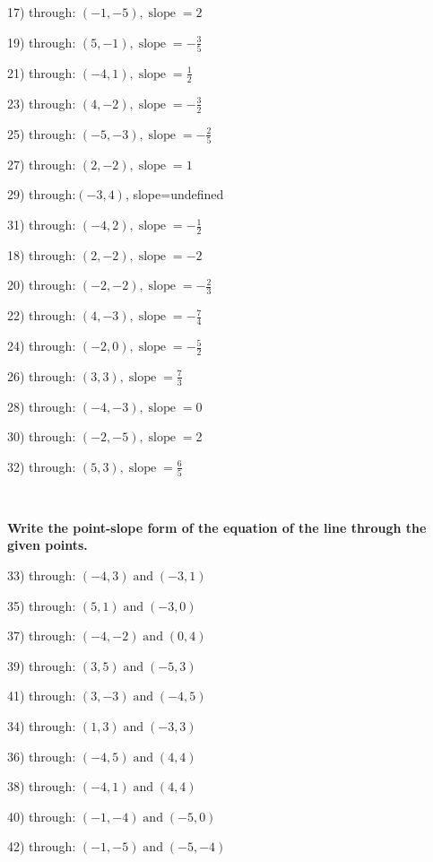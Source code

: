 \documentclass[11pt]{book}
\newcommand{\tmop}[1]{\ensuremath{\operatorname{#1}}}
\newcommand{\tmstrong}[1]{\textbf{#1}}
\theoremstyle{definition}  %
\begin{document}
\begin{multicols}{2}
  17) through: $(- 1, - 5), \tmop{slope} = 2$
  
  19) through: $(5, - 1), \tmop{slope} = - \frac{3}{5}$
  
  21) through: $(- 4, 1), \tmop{slope} = \frac{1}{2}$
  
  23) through: $(4, - 2), \tmop{slope} = - \frac{3}{2}$
  
  25) through: $(- 5, - 3), \tmop{slope} = - \frac{2}{5}$
  
  27) through: $(2, - 2), \tmop{slope} = 1$
  
  29) through:$(- 3, 4)$, slope=undefined
  
  31) through: $(- 4, 2), \tmop{slope} = - \frac{1}{2}$
  
  18) through: $(2, - 2), \tmop{slope} = - 2$
  
  20) through: $(- 2, - 2), \tmop{slope} = - \frac{2}{3}$
  
  22) through: $(4, - 3), \tmop{slope} = - \frac{7}{4}$
  
  24) through: $(- 2, 0), \tmop{slope} = - \frac{5}{2}$
  
  26) through: $(3, 3), \tmop{slope} = \frac{7}{3}$
  
  28) through: $(- 4, - 3), \tmop{slope} =$0
  
  30) through: $(- 2, - 5), \tmop{slope} =$2
  
  32) through: $(5, 3), \tmop{slope} = \frac{6}{5}$
\end{multicols}

\

{\pagebreak}

{\tmstrong{Write the point-slope form of the equation of the line through the
given points.}}

\begin{multicols}{2}
  33) through: $(- 4, 3) \tmop{and} (- 3, 1)$
  
  35) through: $(5, 1) \tmop{and} (- 3, 0)$
  
  37) through: $(- 4, - 2) \tmop{and} (0, 4)$
  
  39) through: $(3, 5) \tmop{and} (- 5, 3)$
  
  41) through: $(3, - 3) \tmop{and} (- 4, 5)$
  
  34) through: $(1, 3) \tmop{and} (- 3, 3)$
  
  36) through: $(- 4, 5) \tmop{and} (4, 4)$
  
  38) through: $(- 4, 1) \tmop{and} (4, 4)$
  
  40) through: $(- 1, - 4) \tmop{and} (- 5, 0)$
  
  42) through: $(- 1, - 5) \tmop{and} (- 5, - 4)$
\end{multicols}
\end{document}
